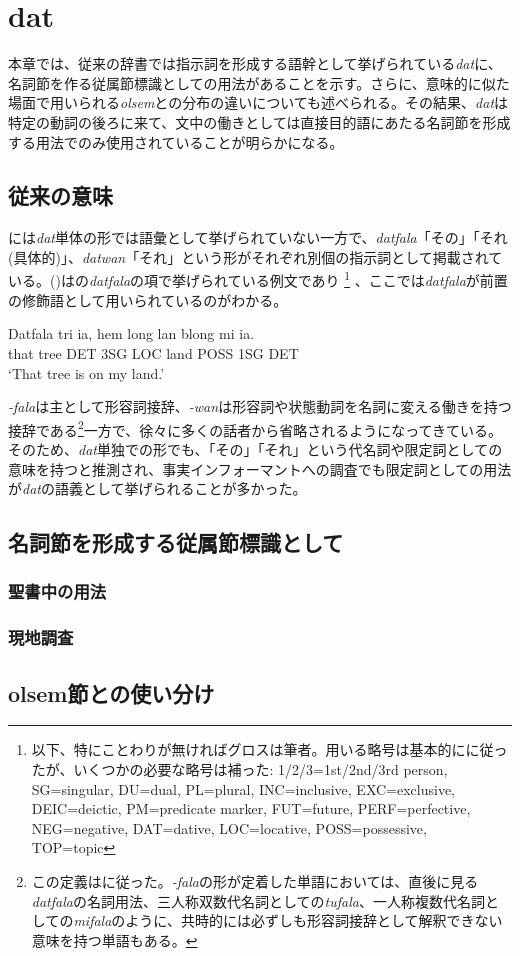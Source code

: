 \chapter{dat}

本章では、従来の辞書では指示詞を形成する語幹として挙げられている\textit{dat}に、名詞節を作る従属節標識としての用法があることを示す。さらに、意味的に似た場面で用いられる\textit{olsem}との分布の違いについても述べられる。その結果、\textit{dat}は特定の動詞の後ろに来て、文中の働きとしては直接目的語にあたる名詞節を形成する用法でのみ使用されていることが明らかになる。

\section{従来の意味}

\cite{dictionary}には\textit{dat}単体の形では語彙として挙げられていない一方で、\textit{datfala}「その」「それ(具体的)」、\textit{datwan}「それ」という形がそれぞれ別個の指示詞として掲載されている。()は\cite{dictionary}の\textit{datfala}の項で挙げられている例文であり
\footnote{以下、特にことわりが無ければグロスは筆者。用いる略号は基本的に\cite{prepositions}に従ったが、いくつかの必要な略号は補った: 1/2/3=1st/2nd/3rd person, SG=singular, DU=dual, PL=plural, INC=inclusive, EXC=exclusive, DEIC=deictic, PM=predicate marker, FUT=future, PERF=perfective, NEG=negative, DAT=dative, LOC=locative, POSS=possessive, TOP=topic}
、ここでは\textit{datfala}が前置の修飾語として用いられているのがわかる。

\begin{exe}
  \ex
  \gll Datfala tri ia, hem long lan blong mi ia.\\
  that tree DET 3SG LOC land POSS 1SG DET\\
  \glt `That tree is on my land.'
\end{exe}

\textit{-fala}は主として形容詞接辞、\textit{-wan}は形容詞や状態動詞を名詞に変える働きを持つ接辞である\footnote{この定義は\cite{syntax}に従った。\textit{-fala}の形が定着した単語においては、直後に見る\textit{datfala}の名詞用法、三人称双数代名詞としての\textit{tufala}、一人称複数代名詞としての\textit{mifala}のように、共時的には必ずしも形容詞接辞として解釈できない意味を持つ単語もある。}一方で、徐々に多くの話者から省略されるようになってきている\citep{syntax}。
そのため、\textit{dat}単独での形でも、「その」「それ」という代名詞や限定詞としての意味を持つと推測され、事実インフォーマントへの調査でも限定詞としての用法が\textit{dat}の語義として挙げられることが多かった。

\section{名詞節を形成する従属節標識として}

\subsection{聖書中の用法}

\subsection{現地調査}

\section{olsem節との使い分け}
